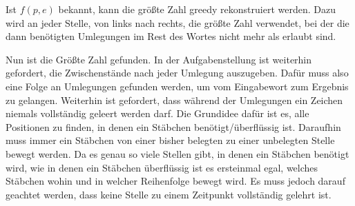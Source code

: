 \documentclass[a4paper,10pt,ngerman]{scrartcl}
\begin{document}
Ist $f(p, e)$ bekannt, kann die größte Zahl greedy rekonstruiert werden. Dazu wird an jeder Stelle, von links nach rechts, die größte Zahl verwendet, bei der die dann benötigten Umlegungen im Rest des Wortes nicht mehr als erlaubt sind. 
Nun ist die Größte Zahl gefunden. In der Aufgabenstellung ist weiterhin gefordert, die Zwischenstände nach jeder Umlegung auszugeben. Dafür muss also eine Folge an Umlegungen gefunden werden, um vom Eingabewort zum Ergebnis zu gelangen. Weiterhin ist gefordert, dass während der Umlegungen ein Zeichen niemals vollständig geleert werden darf. 
Die Grundidee dafür ist es, alle Positionen zu finden, in denen ein Stäbchen benötigt/überflüssig ist. Daraufhin muss immer ein Stäbchen von einer bisher belegten zu einer unbelegten Stelle bewegt werden. Da es genau so viele Stellen gibt, in denen ein Stäbchen benötigt wird, wie in denen ein Stäbchen überflüssig ist es ersteinmal egal, welches Stäbchen wohin und in welcher Reihenfolge bewegt wird. Es muss jedoch darauf geachtet werden, dass keine Stelle zu einem Zeitpunkt vollständig gelehrt ist. 
\end{document}
